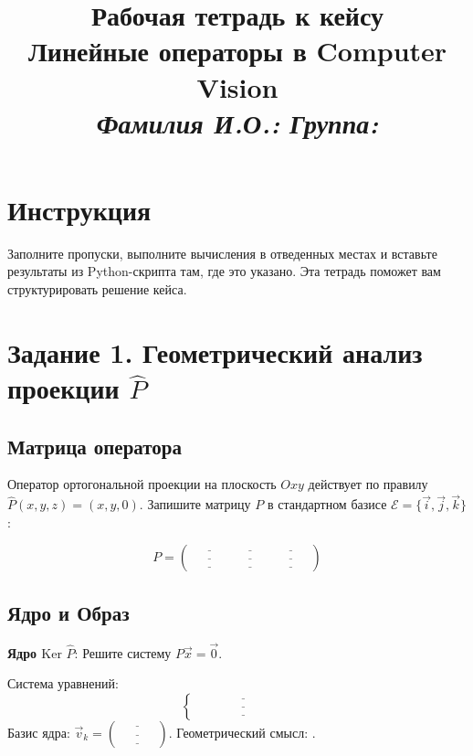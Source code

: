 \documentclass[a4paper,12pt]{article}
\title{\vspace{-2cm}\textbf{Рабочая тетрадь к кейсу}\\[0.5cm]
\large Линейные операторы в Computer Vision\\[0.3cm]
\textit{Фамилия И.О.: \blank[4cm]} \quad \textit{Группа: \blank[2cm]}}
\author{}
\date{}
\newcommand{\blank}[1][5cm]{\underline{\hspace{#1}}}
\newenvironment{solutionbox}{
    \vspace{0.5em}
    \noindent\begin{tcolorbox}[colback=white!95!gray, colframe=gray!50!white, title=\textbf{Место для решения}, sharp corners]
}{
    \end{tcolorbox}
    \vspace{0.5em}
}
\begin{document}
\maketitle
\thispagestyle{fancy}

\section*{Инструкция}
Заполните пропуски, выполните вычисления в отведенных местах и вставьте результаты из Python-скрипта там, где это указано. Эта тетрадь поможет вам структурировать решение кейса.

\section{Задание 1. Геометрический анализ проекции $\hat{P}$}

\subsection{Матрица оператора}
Оператор ортогональной проекции на плоскость $Oxy$ действует по правилу $\hat{P}(x,y,z) = (x,y,0)$.
Запишите матрицу $P$ в стандартном базисе $\mathcal{E} = \{\vec{i}, \vec{j}, \vec{k}\}$:

\begin{solutionbox}
\[
P = \begin{pmatrix} 
\blank[1cm] & \blank[1cm] & \blank[1cm] \\ 
\blank[1cm] & \blank[1cm] & \blank[1cm] \\ 
\blank[1cm] & \blank[1cm] & \blank[1cm] 
\end{pmatrix}
\]
\end{solutionbox}

\subsection{Ядро и Образ}
\textbf{Ядро $\text{Ker }\hat{P}$}: Решите систему $P\vec{x} = \vec{0}$.

\begin{solutionbox}
Система уравнений:
\[
\begin{cases}
\blank[3cm] \\
\blank[3cm] \\
\blank[3cm]
\end{cases}
\]
Базис ядра: $\vec{v}_k = \begin{pmatrix} \blank[1cm] \\ \blank[1cm] \\ \blank[1cm] \end{pmatrix}$.
Геометрический смысл: \blank[6cm].
\end{solutionbox}
\end{document}
